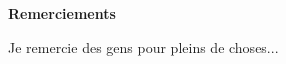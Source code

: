 \vspace*{3cm}
\begin{center}
  \begin{huge}
    \textbf{Remerciements}
  \end{huge}
\end{center}
\vspace*{2cm}

Je remercie des gens pour pleins de choses...

